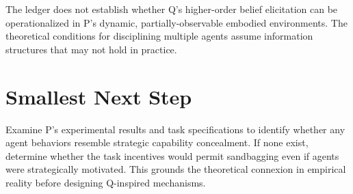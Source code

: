 \documentclass{article}
\begin{document}
The ledger does not establish whether Q's higher-order belief elicitation can be operationalized in P's dynamic, partially-observable embodied environments. The theoretical conditions for disciplining multiple agents assume information structures that may not hold in practice.

\section*{Smallest Next Step}

Examine P's experimental results and task specifications to identify whether any agent behaviors resemble strategic capability concealment. If none exist, determine whether the task incentives would permit sandbagging even if agents were strategically motivated. This grounds the theoretical connexion in empirical reality before designing Q-inspired mechanisms.
\end{document}
